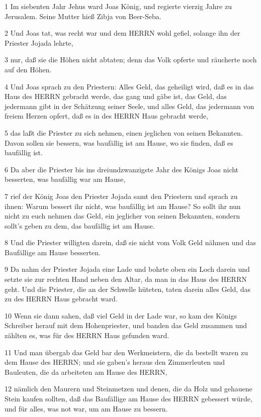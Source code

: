 \par 1 Im siebenten Jahr Jehus ward Joas König, und regierte vierzig Jahre zu Jerusalem. Seine Mutter hieß Zibja von Beer-Seba.
\par 2 Und Joas tat, was recht war und dem HERRN wohl gefiel, solange ihn der Priester Jojada lehrte,
\par 3 nur, daß sie die Höhen nicht abtaten; denn das Volk opferte und räucherte noch auf den Höhen.
\par 4 Und Joas sprach zu den Priestern: Alles Geld, das geheiligt wird, daß es in das Haus des HERRN gebracht werde, das gang und gäbe ist, das Geld, das jedermann gibt in der Schätzung seiner Seele, und alles Geld, das jedermann von freiem Herzen opfert, daß es in des HERRN Haus gebracht werde,
\par 5 das laßt die Priester zu sich nehmen, einen jeglichen von seinen Bekannten. Davon sollen sie bessern, was baufällig ist am Hause, wo sie finden, daß es baufällig ist.
\par 6 Da aber die Priester bis ins dreiundzwanzigste Jahr des Königs Joas nicht besserten, was baufällig war am Hause,
\par 7 rief der König Joas den Priester Jojada samt den Priestern und sprach zu ihnen: Warum bessert ihr nicht, was baufällig ist am Hause? So sollt ihr nun nicht zu euch nehmen das Geld, ein jeglicher von seinen Bekannten, sondern sollt's geben zu dem, das baufällig ist am Hause.
\par 8 Und die Priester willigten darein, daß sie nicht vom Volk Geld nähmen und das Baufällige am Hause besserten.
\par 9 Da nahm der Priester Jojada eine Lade und bohrte oben ein Loch darein und setzte sie zur rechten Hand neben den Altar, da man in das Haus des HERRN geht. Und die Priester, die an der Schwelle hüteten, taten darein alles Geld, das zu des HERRN Haus gebracht ward.
\par 10 Wenn sie dann sahen, daß viel Geld in der Lade war, so kam des Königs Schreiber herauf mit dem Hohenpriester, und banden das Geld zusammen und zählten es, was für des HERRN Haus gefunden ward.
\par 11 Und man übergab das Geld bar den Werkmeistern, die da bestellt waren zu dem Hause des HERRN; und sie gaben's heraus den Zimmerleuten und Bauleuten, die da arbeiteten am Hause des HERRN,
\par 12 nämlich den Maurern und Steinmetzen und denen, die da Holz und gehauene Stein kaufen sollten, daß das Baufällige am Hause des HERRN gebessert würde, und für alles, was not war, um am Hause zu bessern.
